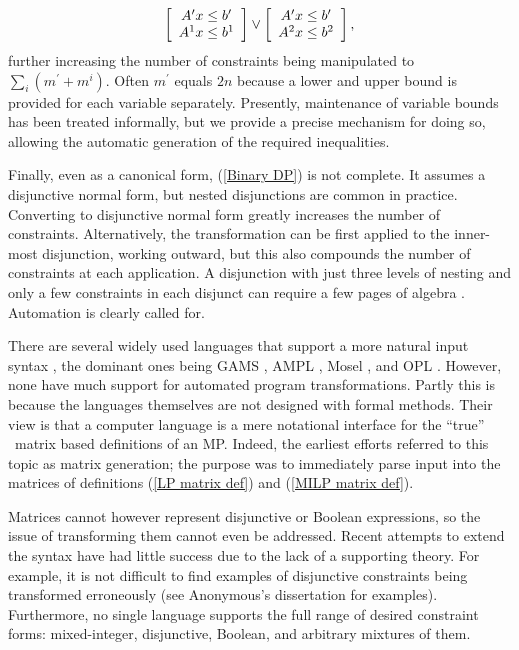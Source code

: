 \documentclass[preprint]{sigplanconf}%
\theoremstyle{remark}
\begin{document}
\begin{equation}
\left[
\begin{array}
[c]{c}%
A^{\prime}x\leq b^{\prime}\\
A^{1}x\leq b^{1}%
\end{array}
\right]  \vee\left[
\begin{array}
[c]{c}%
A^{\prime}x\leq b^{\prime}\\
A^{2}x\leq b^{2}%
\end{array}
\right]  ,
\end{equation}
further increasing the number of constraints being manipulated to $%
{\textstyle\sum_{i}}
(m^{\prime}+m^{i})$. Often $m^{\prime}$ equals $2n$ because a lower and upper
bound is provided for each variable separately. Presently, maintenance of
variable bounds has been treated informally, but we provide a precise
mechanism for doing so, allowing the automatic generation of the required inequalities.

Finally, even as a canonical form, (\ref{Binary DP}) is not complete. It
assumes a disjunctive normal form, but nested disjunctions are common in
practice. Converting to disjunctive normal form greatly increases the number
of constraints. Alternatively, the transformation can be first applied to the
inner-most disjunction, working outward, but this also compounds the number of
constraints at each application. A disjunction with just three levels of
nesting and only a few constraints in each disjunct can require a few pages of
algebra \cite{h3000}. Automation is clearly called for.

There are several widely used languages that support a more natural input
syntax \cite{Kallrath2004}, the dominant ones being GAMS \cite{Bisschop1982},
AMPL \cite{Fourer1990}, Mosel \cite{Colombani2002}, and OPL
\cite{vanHentenryck1999}. However, none have much support for automated
program transformations. Partly this is because the languages themselves are
not designed with formal methods. Their view is that a computer language is a
mere notational interface for the \textquotedblleft true\textquotedblright%
\ matrix based definitions of an MP. Indeed, the earliest efforts referred to
this topic as matrix generation; the purpose was to immediately parse input
into the matrices of definitions (\ref{LP matrix def}) and
(\ref{MILP matrix def}).

Matrices cannot however represent disjunctive or Boolean expressions, so the
issue of transforming them cannot even be addressed. Recent attempts to extend
the syntax have had little success due to the lack of a supporting theory. For
example, it is not difficult to find examples of disjunctive constraints being
transformed erroneously (see Anonymous's dissertation \cite{a3000} for
examples). Furthermore, no single language supports the full range of desired
constraint forms: mixed-integer, disjunctive, Boolean, and arbitrary mixtures
of them.
\end{document}
